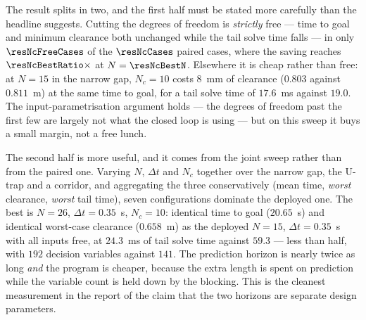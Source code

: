 \documentclass[11pt,a4paper]{article}
\newcommand{\Ninput}{N_c}
\begin{document}
\begin{table}[htbp]
  \centering
  \small
  \caption{%
  Closed-loop outcome against the control horizon at fixed prediction horizon.}
  \label{res:tab:nc}
\end{table}

The result splits in two, and the first half must be stated more carefully than the headline suggests.
Cutting the degrees of freedom is \emph{strictly} free --- time to goal and minimum clearance both unchanged
while the tail solve time falls --- in only $\resNcFreeCases$ of the $\resNcCases$ paired cases, where the
saving reaches $\resNcBestRatio\times$ at $N=\resNcBestN$. Elsewhere it is cheap rather than free: at
$N=15$ in the narrow gap, $\Ninput=10$ costs $8$~mm of clearance ($0.803$ against $0.811$~m) at the same time
to goal, for a tail solve time of $17.6$~ms against $19.0$. The input-parametrisation argument holds --- the
degrees of freedom past the first few are largely not what the closed loop is using --- but on this sweep it
buys a small margin, not a free lunch.

The second half is more useful, and it comes from the joint sweep rather than from the paired one. Varying
$N$, $\Delta t$ and $\Ninput$ together over the narrow gap, the U-trap and a corridor, and aggregating the
three conservatively (mean time, \emph{worst} clearance, \emph{worst} tail time), seven configurations
dominate the deployed one. The best is $N=26$, $\Delta t=0.35$~s, $\Ninput=10$: identical time to goal
($20.65$~s) and identical worst-case clearance ($0.658$~m) as the deployed $N=15$, $\Delta t=0.35$~s with all
inputs free, at $24.3$~ms of tail solve time against $59.3$ --- less than half, with $192$ decision variables
against $141$. The prediction horizon is nearly twice as long \emph{and} the program is cheaper, because the
extra length is spent on prediction while the variable count is held down by the blocking. This is the
cleanest measurement in the report of the claim that the two horizons are separate design parameters.

\end{document}
